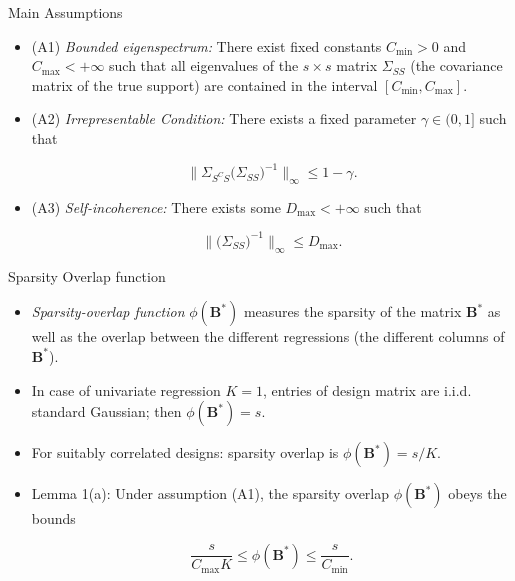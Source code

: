 \documentclass[notes]{beamer}       %
\begin{document}
\begin{frame}{Main Assumptions}{}
  \begin{itemize}
  \item {
    (A1) \textit{Bounded eigenspectrum:} There exist fixed constants \(C_{\text{min}} > 0\) and \(C_{\text{max}} < + \infty\) such that all eigenvalues of the \(s \times s\) matrix \(\Sigma_{SS}\) (the covariance matrix of the true support) are contained in the interval \([C_{\text{min}}, C_{\text{max}}]\). 
  }
  \item {
    (A2) \textit{Irrepresentable Condition:} There exists a fixed parameter \(\gamma \in (0,1]\) such that
    
    \[
    \lVert \Sigma_{S^CS} \big( \Sigma_{SS} \big)^{-1} \rVert_{\infty} \leq 1 - \gamma.
    \]
    
   
  }
  \item {
    (A3) \textit{Self-incoherence:} There exists some \(D_{\text{max}} < + \infty\) such that
    
    \[
      \lVert \big( \Sigma_{SS} \big)^{-1} \rVert_{\infty} \leq D_{\text{max}}.
    \]
    
  
  }
  \end{itemize}
\end{frame}


\begin{frame}{Sparsity Overlap function}{}
  \begin{itemize}
  \item{\textit{Sparsity-overlap function} \(\phi(\boldsymbol{B}^*) \) measures the sparsity of the matrix \(\boldsymbol{B}^*\) as well as the overlap between the different regressions (the different columns of \(\boldsymbol{B}^*\)).
 }

  \item{In case of univariate regression \(K=1\), entries of design matrix are i.i.d.  standard Gaussian; then \(\phi(\boldsymbol{B}^*)=s\).
  }
  \item{For suitably correlated designs: sparsity overlap is  \(\phi(\boldsymbol{B}^*)=s/K\).
  }
  \item{Lemma 1(a): Under assumption (A1), the sparsity overlap \(\phi(\boldsymbol{B}^*)\) obeys the bounds
  
  \[
  \frac{s}{C_{\text{max}}K} \leq \phi(\boldsymbol{B}^*) \leq \frac{s}{C_{\text{min}}}.
  \]
  }


  \end{itemize}
\end{frame}
\end{document}
